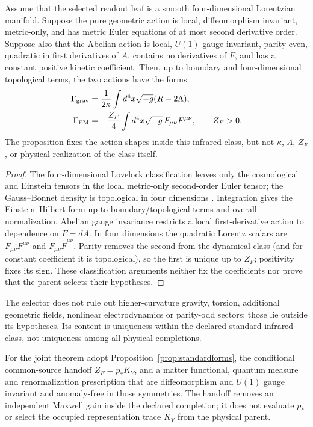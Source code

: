 \begin{proposition}
\label{prop:standardforms}
Assume that the selected readout leaf is a smooth four-dimensional Lorentzian
manifold.  Suppose the pure geometric action is local, diffeomorphism
invariant, metric-only, and has metric Euler equations of at most second
derivative order.  Suppose also that the Abelian action is local,
$U(1)$-gauge invariant, parity even, quadratic in first derivatives of $A$,
contains no derivatives of $F$, and has a constant positive kinetic
coefficient.  Then, up to boundary and four-dimensional topological terms,
the two actions have the forms
\begin{align}
\Gamma_{\rm grav}&=\frac{1}{2\kappa}\int d^4x\sqrt{-g}(R-2\Lambda),\\
\Gamma_{\rm EM}&=-\frac{Z_F}{4}\int d^4x\sqrt{-g}\,F_{\mu\nu}F^{\mu\nu},
\qquad Z_F>0.
\end{align}
The proposition fixes the action shapes inside this infrared class, but not
$\kappa$, $\Lambda$, $Z_F$, or physical realization of the class itself.
\end{proposition}
\begin{proof}
The four-dimensional Lovelock classification leaves only the cosmological and
Einstein tensors in the local metric-only second-order Euler tensor; the
Gauss--Bonnet density is topological in four dimensions
\citep{Lovelock1971}.  Integration gives the Einstein--Hilbert form up to
boundary/topological terms and overall normalization.  Abelian gauge
invariance restricts a local first-derivative action to dependence on
$F=dA$.  In four dimensions the quadratic Lorentz scalars are
$F_{\mu\nu}F^{\mu\nu}$ and
$F_{\mu\nu}\widetilde F^{\mu\nu}$.  Parity removes the second from the
dynamical class (and for constant coefficient it is topological), so the
first is unique up to $Z_F$; positivity fixes its sign.  These classification
arguments neither fix the coefficients nor prove that the parent selects
their hypotheses.
\end{proof}

The selector does not rule out higher-curvature gravity, torsion, additional
geometric fields, nonlinear electrodynamics or parity-odd sectors; those lie
outside its hypotheses.  Its content is uniqueness within the declared
standard infrared class, not uniqueness among all physical completions.

For the joint theorem adopt Proposition~\ref{prop:standardforms}, the
conditional common-source handoff $Z_F=p_*K_Y$, and a matter functional,
quantum measure and renormalization prescription that are diffeomorphism and
$U(1)$ gauge invariant and anomaly-free in those symmetries.  The handoff
removes an independent Maxwell gain inside the declared completion; it does
not evaluate $p_*$ or select the occupied representation trace $K_Y$ from the
physical parent.

